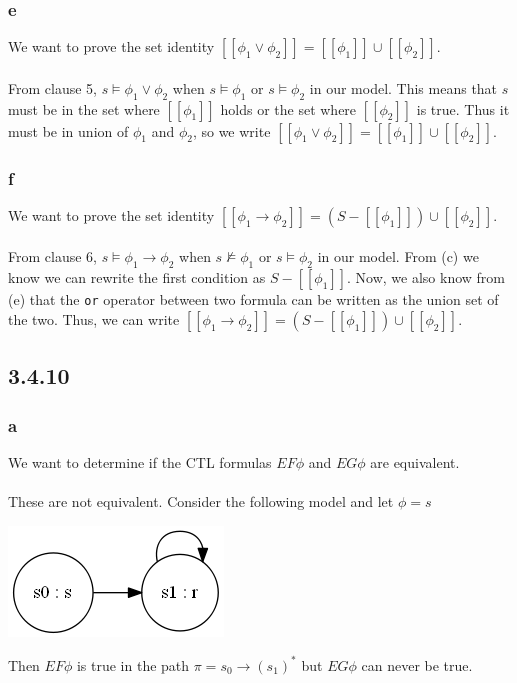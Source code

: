 \documentclass[12pt]{article}
\begin{document}
\subsubsection*{e}
We want to prove the set identity $[[\phi_1\lor\phi_2]]=[[\phi_1]]\cup [[\phi_2]]$.\\
\\
From clause 5, $s\models \phi_1\lor\phi_2$ when $s\models\phi_1$ or $s\models\phi_2$ in our model. This means that $s$ must be in the set where $[[\phi_1]]$ holds or the set where $[[\phi_2]]$ is true. Thus it must be in union of $\phi_1$ and $\phi_2$, so we write $[[\phi_1\lor\phi_2]]=[[\phi_1]]\cup[[\phi_2]]$.
\newpage
\subsubsection*{f}
We want to prove the set identity $[[\phi_1\to\phi_2]]=(S-[[\phi_1]])\cup [[\phi_2]]$.\\
\\
From clause 6, $s\models \phi_1\to\phi_2$ when $s\not\models\phi_1$ or $s\models\phi_2$ in our model. From (c) we know we can rewrite the first condition as $S-[[\phi_1]]$. Now, we also know from (e) that the \texttt{or} operator between two formula can be written as the union set of the two. Thus, we can write $[[\phi_1\to\phi_2]]=(S-[[\phi_1]])\cup [[\phi_2]]$.

\subsection*{3.4.10}
\subsubsection*{a}
We want to determine if the CTL formulas $EF\phi$ and $EG\phi$ are equivalent.\\
\\
These are not equivalent. Consider the following model and let $\phi=s$
\begin{center}
\includegraphics[scale=0.75]{graph1}
\end{center}
Then $EF\phi$ is true in the path $\pi=s_0\to (s_1)^*$ but $EG\phi$ can never be true.
\end{document}
